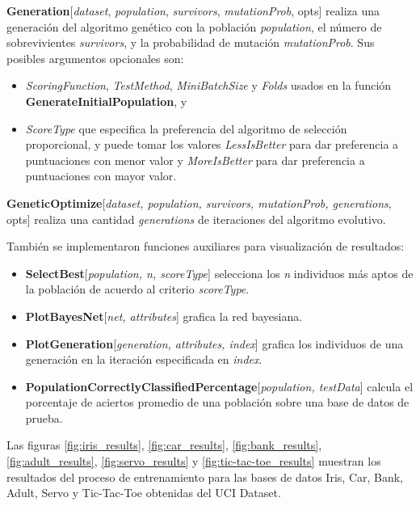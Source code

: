 \documentclass[10pt,a4paper]{article}
\begin{document}
\textbf{Generation}[\textit{dataset}, \textit{population}, \textit{survivors}, \textit{mutationProb}, opts] realiza una generación del algoritmo genético con la población \textit{population}, el número de sobrevivientes \textit{survivors}, y la probabilidad de mutación \textit{mutationProb}. Sus posibles argumentos opcionales son: 
\begin{itemize}
\item \textit{ScoringFunction}, \textit{TestMethod}, \textit{MiniBatchSize} y \textit{Folds} usados en la función \textbf{GenerateInitialPopulation}, y
\item \textit{ScoreType} que especifica la preferencia del algoritmo de selección proporcional, y puede tomar los valores \textit{LessIsBetter} para dar preferencia a puntuaciones con menor valor y \textit{MoreIsBetter} para dar preferencia a puntuaciones con mayor valor.
\end{itemize}

\textbf{GeneticOptimize}[\textit{dataset, population, survivors, mutationProb, generations}, opts] realiza una cantidad \textit{generations} de iteraciones del algoritmo evolutivo.

También se implementaron funciones auxiliares para visualización de resultados:
\begin{itemize}
\item \textbf{SelectBest}[\textit{population, n, scoreType}] selecciona los \textit{n} individuos más aptos de la población de acuerdo al criterio \textit{scoreType}.
\item \textbf{PlotBayesNet}[\textit{net, attributes}] grafica la red bayesiana.
\item \textbf{PlotGeneration}[\textit{generation, attributes, index}] grafica los individuos de una generación en la iteración especificada en \textit{index}.
\item \textbf{PopulationCorrectlyClassifiedPercentage}[\textit{population, testData}] calcula el porcentaje de aciertos promedio de una población sobre una base de datos de prueba.
\end{itemize}

Las figuras \ref{fig:iris_results}, \ref{fig:car_results}, \ref{fig:bank_results}, \ref{fig:adult_results}, \ref{fig:servo_results} y \ref{fig:tic-tac-toe_results} muestran los resultados del proceso de entrenamiento para las bases de datos Iris, Car, Bank, Adult, Servo y Tic-Tac-Toe obtenidas del UCI Dataset.
\end{document}
